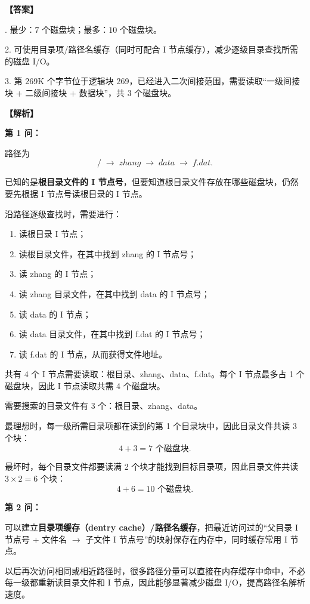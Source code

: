 \documentclass[UTF8,12pt]{ctexart}
\newenvironment{explanation}{\par\noindent\textbf{【解析】}\par\smallskip}{\par\medskip}
\newenvironment{answer}{\par\noindent\textbf{【答案】}\par\smallskip}{\par}
\begin{document}
\begin{answer}
1. 最少：\(\boxed{7}\) 个磁盘块；最多：\(\boxed{10}\) 个磁盘块。

2. 可使用目录项/路径名缓存（同时可配合 I 节点缓存），减少逐级目录查找所需的磁盘 I/O。

3. 第 269K 个字节位于逻辑块 269，已经进入二次间接范围，需要读取“一级间接块 + 二级间接块 + 数据块”，共 \(\boxed{3}\) 个磁盘块。
\end{answer}

\begin{explanation}
\textbf{第 1 问：}

路径为
\[
/\;\longrightarrow\;zhang\;\longrightarrow\;data\;\longrightarrow\;f.dat.
\]

已知的是\textbf{根目录文件的 I 节点号}，但要知道根目录文件存放在哪些磁盘块，仍然要先根据 I 节点号读根目录的 I 节点。

沿路径逐级查找时，需要进行：
\begin{enumerate}
  \item 读根目录 I 节点；
  \item 读根目录文件，在其中找到 zhang 的 I 节点号；
  \item 读 zhang 的 I 节点；
  \item 读 zhang 目录文件，在其中找到 data 的 I 节点号；
  \item 读 data 的 I 节点；
  \item 读 data 目录文件，在其中找到 f.dat 的 I 节点号；
  \item 读 f.dat 的 I 节点，从而获得文件地址。
\end{enumerate}

共有 4 个 I 节点需要读取：根目录、zhang、data、f.dat。每个 I 节点最多占 1 个磁盘块，因此 I 节点读取共需 4 个磁盘块。

需要搜索的目录文件有 3 个：根目录、zhang、data。

最理想时，每一级所需目录项都在读到的第 1 个目录块中，因此目录文件共读 3 个块：
\[
4+3=\boxed{7}\text{ 个磁盘块}.
\]

最坏时，每个目录文件都要读满 2 个块才能找到目标目录项，因此目录文件共读 $3\times2=6$ 个块：
\[
4+6=\boxed{10}\text{ 个磁盘块}.
\]

\medskip
\textbf{第 2 问：}

可以建立\textbf{目录项缓存（dentry cache）/路径名缓存}，把最近访问过的“父目录 I 节点号 + 文件名 $\rightarrow$ 子文件 I 节点号”的映射保存在内存中，同时缓存常用 I 节点。

以后再次访问相同或相近路径时，很多路径分量可以直接在内存缓存中命中，不必每一级都重新读目录文件和 I 节点，因此能够显著减少磁盘 I/O，提高路径名解析速度。


\end{explanation}
\end{document}

